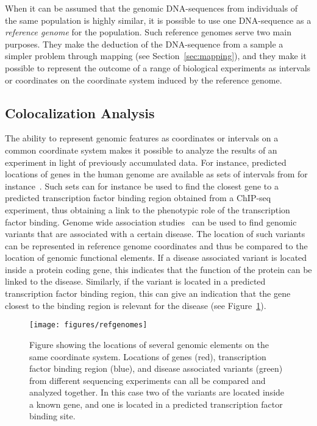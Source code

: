 When it can be assumed that the genomic DNA-sequences from individuals of the same population is highly similar, it is possible to use one DNA-sequence as a \emph{reference genome} for the population.
Such reference genomes serve two main purposes.
They make the deduction of the DNA-sequence from a sample a simpler problem through mapping (see Section~\ref{sec:mapping}), and they make it possible to represent the outcome of a range of biological experiments as intervals or coordinates on the coordinate system induced by the reference genome. 

\subsection{Colocalization Analysis}
The ability to represent genomic features as coordinates or intervals on a common coordinate system makes it possible to analyze the results of an experiment in light of previously accumulated data.
For instance, predicted locations of genes in the human genome are available as sets of intervals from for instance~\cite{genelist}.
Such sets can for instance be used to find the closest gene to a predicted transcription factor binding region obtained from a ChIP-seq experiment, thus obtaining a link to the phenotypic role of the transcription factor binding.
Genome wide association studies~\cite{gwas} can be used to find genomic variants that are associated with a certain disease.
The location of such variants can be represented in reference genome coordinates and thus be compared to the location of genomic functional elements.
If a disease associated variant is located inside a protein coding gene, this indicates that the function of the protein can be linked to the disease.
Similarly, if the variant is located in a predicted transcription factor binding region, this can give an indication that the gene closest to the binding region is relevant for the disease (see Figure~\ref{fig:refpos}).
\begin{figure}
  \texttt{[image: figures/refgenomes]}
  \caption{Figure showing the locations of several genomic elements on the same coordinate system.
    Locations of genes (red), transcription factor binding region (blue), and disease associated variants (green) from different sequencing experiments can all be compared and analyzed together.
    In this case two of the variants are located inside a known gene, and one is located in a predicted transcription factor binding site.
  }
  \label{fig:refpos}

\end{figure}

